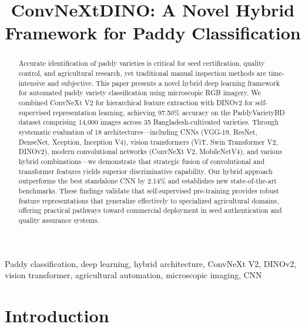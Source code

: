 \documentclass[conference]{IEEEtran}
\begin{document}
\title{
ConvNeXtDINO: A Novel Hybrid Framework for Paddy Classification
}

\author{
}

\maketitle

\begin{abstract}
Accurate identification of paddy varieties is critical for seed certification, quality control, and agricultural research, yet traditional manual inspection methods are time-intensive and subjective. This paper presents a novel hybrid deep learning framework for automated paddy variety classification using microscopic RGB imagery. We combined ConvNeXt V2 for hierarchical feature extraction with DINOv2 for self-supervised representation learning, achieving 97.50\% accuracy on the PaddyVarietyBD dataset comprising 14,000 images across 35 Bangladesh-cultivated varieties. Through systematic evaluation of 18 architectures—including CNNs (VGG-19, ResNet, DenseNet, Xception, Inception V4), vision transformers (ViT, Swin Transformer V2, DINOv2), modern convolutional networks (ConvNeXt V2, MobileNetV4), and various hybrid combinations—we demonstrate that strategic fusion of convolutional and transformer features yields superior discriminative capability. Our hybrid approach outperforms the best standalone CNN by 2.14\% and establishes new state-of-the-art benchmarks. These findings validate that self-supervised pre-training provides robust feature representations that generalize effectively to specialized agricultural domains, offering practical pathways toward commercial deployment in seed authentication and quality assurance systems.
\end{abstract}

\begin{IEEEkeywords}
Paddy classification, deep learning, hybrid architecture, ConvNeXt V2, DINOv2, vision transformer, agricultural automation, microscopic imaging, CNN
\end{IEEEkeywords}

\section{Introduction}
\end{document}
